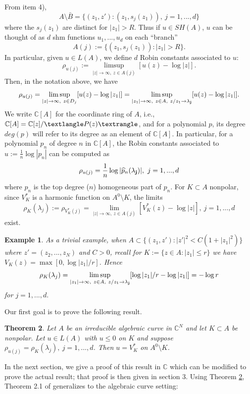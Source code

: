 \documentclass[12pt]{article}
\numberwithin{equation}{section}
\newtheorem{theorem}{Theorem}[section]
\newtheorem{Example}[theorem]{Example}
\newenvironment{example}{\begin{Example}\rm}{\end{Example}}
\newcommand{\C}{\mathbb{C}}
\renewcommand{\hat}{\widehat}
\begin{document}
From item 4), 
$$A\setminus \bar B=\{(z_1,z'): (z_1,s_j(z_1)), \ j=1,...,d\}$$
where the $s_j(z_1)$ are distinct for $|z_1|>R$. Thus if $u\in SH(A)$, $u$ can be thought of as $d$ shm functions $u_1,...,u_d$ on each ``branch'' 
$$A(j):=\{(z_1,s_j(z_1)): |z_1|>R \}.$$
In particular, given $u\in L(A)$, we define $d$ Robin constants associated to $u$:
\begin{equation} \label{robindef} \rho_{u(j)}:= \limsup_{|z|\to \infty, \ z \in A(j)} [u(z) - \log |z|].
\end{equation}  
Then, in the notation above, we have 
$$\rho_{u(j)}=\limsup_{|z|\to \infty, \ z\in D_j}[u(z)-\log |z_1|]=\limsup_{|z_1|\to \infty, \ z \in A, \ z/z_1\to {\bf \lambda_j}}[u(z)-\log |z_1|].$$
We write $\C[A]$ for the coordinate ring of $A$, i.e., $\C[A]=\C[z]/\textlangle P(z)\textrangle$, and for a polynomial $p$, its degree $deg(p)$ will refer to its degree as an element of $\C[A]$. In particular, for a polynomial $p_n$ of degree $n$ in $\C[A]$, the Robin constants associated to $u:=\frac{1}{n} \log |p_n|$ can be computed as 
\begin{equation}\label{robpoly}  \rho_{u(j)}=\frac{1}{n} \log |\hat p_n({\bf{\lambda_j}})|,  \ j=1,...,d \end{equation}
where $\hat p_n$ is the top degree ($n$) homogeneous part of $p_n$. 
For $K\subset A$ nonpolar, since $V_K^*$ is a harmonic function on $A^0\setminus K$, the limits 
$$\rho_K(\lambda_j):=\rho_{V_K^*(j)}=\lim_{|z|\to \infty, \ z \in A(j)} [V_K^*(z) - \log |z|], \ j=1,...,d$$
exist. 

\begin{example} As a trivial example, when $A\subset \{(z_1,z'): |z'|^2  < C(1+|z_1|^2)\}$
where $z'=(z_2,...,z_{N})$ and $C>0$, recall for $K:=\{z\in A: |z_1|\leq r\}$ we have $V_K(z)=\max[0,\log |z_1|/r]$. Hence 
$$\rho_K(\lambda_j)=\limsup_{|z_1|\to \infty, \ z \in A, \ z/z_1\to {\bf \lambda_j}}[\log |z_1|/r-\log |z_1|]=-\log r$$
for $j=1,...,d.$
\end{example}

Our first goal is to prove the following result.

\begin{theorem} \label{mainth} Let $A$ be an irreducible algebraic curve in $\C^N$ and let $K\subset A$ be nonpolar. Let $u\in L(A)$ with 
$u\leq 0$ on $K$ and suppose $\rho_{u(j)}= \rho_K(\lambda_j), \ j=1,...,d$. Then $u=V_K^*$ on $A^0\setminus K$.
\end{theorem}

In the next section, we give a proof of this result in $\C$ which can be modified to prove the actual result; that proof is then given in section 3. 
Using Theorem \ref{mainth}, Theorem 2.1 of \cite{B98} generalizes to the algebraic curve setting:
\end{document}

